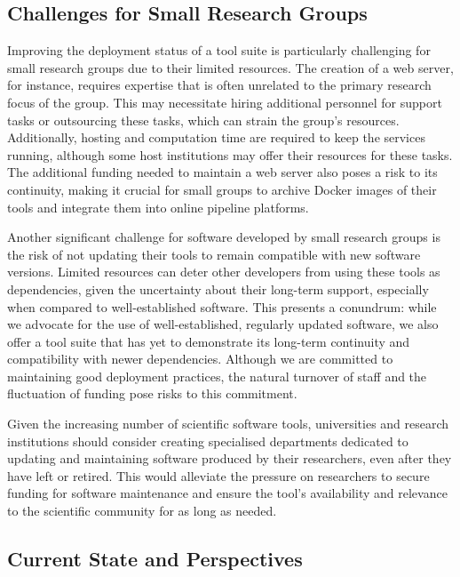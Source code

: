 \subsection{Challenges for Small Research Groups}

Improving the deployment status of a tool suite is particularly challenging for small research groups due to their limited resources. The creation of a web server, for instance, requires expertise that is often unrelated to the primary research focus of the group. This may necessitate hiring additional personnel for support tasks or outsourcing these tasks, which can strain the group's resources. Additionally, hosting and computation time are required to keep the services running, although some host institutions may offer their resources for these tasks. The additional funding needed to maintain a web server also poses a risk to its continuity, making it crucial for small groups to archive Docker images of their tools and integrate them into online pipeline platforms.

Another significant challenge for software developed by small research groups is the risk of not updating their tools to remain compatible with new software versions. Limited resources can deter other developers from using these tools as dependencies, given the uncertainty about their long-term support, especially when compared to well-established software. This presents a conundrum: while we advocate for the use of well-established, regularly updated software, we also offer a tool suite that has yet to demonstrate its long-term continuity and compatibility with newer dependencies. Although we are committed to maintaining good deployment practices, the natural turnover of staff and the fluctuation of funding pose risks to this commitment.

Given the increasing number of scientific software tools, universities and research institutions should consider creating specialised departments dedicated to updating and maintaining software produced by their researchers, even after they have left or retired. This would alleviate the pressure on researchers to secure funding for software maintenance and ensure the tool's availability and relevance to the scientific community for as long as needed.


\subsection{Current State and Perspectives}

